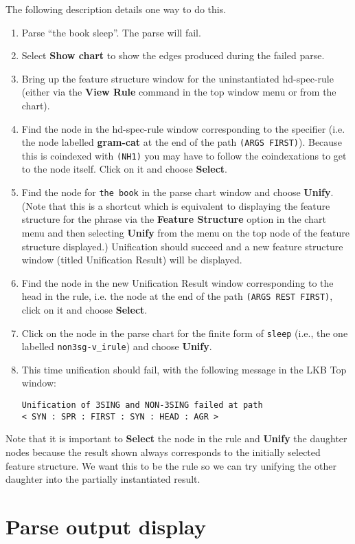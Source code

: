 \documentclass[12pt]{report}
\begin{document}
The following description details one way to do this.
\begin{enumerate}
\item Parse ``the book sleep''.  The parse will fail.
\item Select {\bf Show chart} to show the edges produced
during the failed parse.
\item Bring up the feature structure window for 
the uninstantiated hd-spec-rule 
(either via the {\bf View Rule} command in the top window menu
or from the chart).
\item Find the node in the hd-spec-rule window corresponding
to the specifier (i.e. the node labelled {\bf gram-cat} at
the end of the path {\tt (ARGS FIRST)}).  Because this is
coindexed with {\tt (NH1)} you may have to follow the coindexations
to get to the node itself.
Click on it and choose {\bf Select}.
\item Find the
node for {\tt the book} in the parse chart window
and choose {\bf Unify}.
(Note that this is a shortcut which is equivalent to displaying the 
feature structure for the
phrase via the {\bf Feature Structure} option in the 
chart menu and then selecting {\bf Unify} from the menu on 
the top node of the feature structure displayed.)
Unification should succeed and a new feature structure
window (titled Unification Result) will be displayed.  
\item Find the node in the new Unification Result window corresponding
to the head in the rule, i.e. the node at
the end of the path {\tt (ARGS REST FIRST)}, click on it and choose {\bf Select}.
\item Click on the
node in the parse chart for the finite form of
{\tt sleep} (i.e., the one labelled
{\tt non3sg-v\_irule}) and choose {\bf Unify}.
\item This time unification should fail, with the following message
in the LKB Top window:
\begin{verbatim}
Unification of 3SING and NON-3SING failed at path 
< SYN : SPR : FIRST : SYN : HEAD : AGR >
\end{verbatim}
\end{enumerate}

Note that it is important to 
{\bf Select} the node in the rule and {\bf Unify} the daughter nodes
because the result shown always corresponds to the 
initially selected feature structure.  
We want this to be the rule so we can try
unifying the other daughter into the partially instantiated result.


\section{Parse output display}
\label{parseout}
\end{document}

